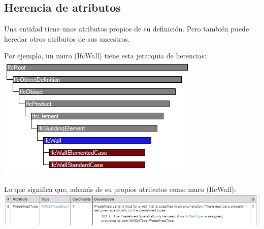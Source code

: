\documentclass[spanish,12pt,a4paper,final,oneside]{book}
\begin{document}
\subsection{Herencia de atributos}
Una entidad tiene unos atributos propios de su definición. Pero también puede heredar otros atributos de sus ancestros.

Por ejemplo, un muro (IfcWall) tiene esta jerarquia de herencias:
\\ \includegraphics[scale=.7]{jerarquia de IfcWall}

Lo que significa que, además de su propios atributos como muro (IfcWall):
\\ \includegraphics[width=.7\textwidth]{atributos de IfcWall}
\end{document}
